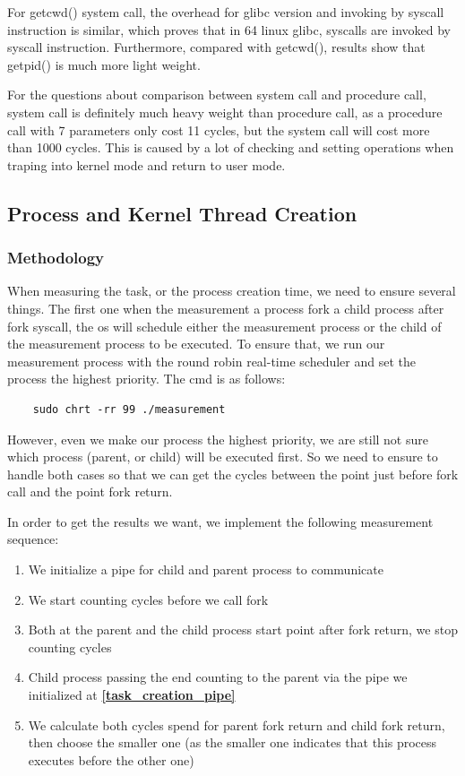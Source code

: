 For getcwd() system call, the overhead for glibc version and invoking by syscall instruction is similar, which proves that in 64 linux glibc, syscalls are invoked by syscall instruction. Furthermore, compared with getcwd(), results show that getpid() is much more light weight.

For the questions about comparison between system call and procedure call, system call is definitely much heavy weight than procedure call, as a procedure call with 7 parameters only cost 11 cycles, but the system call will cost more than 1000 cycles. This is caused by a lot of checking and setting operations when traping into kernel mode and return to user mode.

\subsection{Process and Kernel Thread Creation}

\subsubsection{Methodology}
\label {creation_methodology}

When measuring the task, or the process creation time, we need to ensure several things. The first one when the measurement a process fork a child process after fork syscall, the os will schedule either the measurement process or the child of the measurement process to be executed. To ensure that, we run our measurement process with the round robin real-time scheduler and set the process the highest priority. The cmd is as follows:

\begin{lstlisting}
    sudo chrt -rr 99 ./measurement
\end{lstlisting}

However, even we make our process the highest priority,  we are still not sure which process (parent, or child) will be executed first. So we need to ensure to handle both cases so that we can get the cycles between the point just before fork call and the point fork return.

In order to get the results we want, we implement the following measurement sequence:

\begin{enumerate}
    \item We initialize a pipe for child and parent process to communicate \label{task_creation_pipe}
    \item We start counting cycles before we call fork
    \item Both at the parent and the child process start point after fork return, we stop counting cycles
    \item Child process passing the end counting to the parent via the pipe we initialized at \textbf{\ref{task_creation_pipe}}
    \item We calculate both cycles spend for parent fork return and child fork return, then choose the smaller one (as the smaller one indicates that this process executes before the other one)
\end{enumerate}

